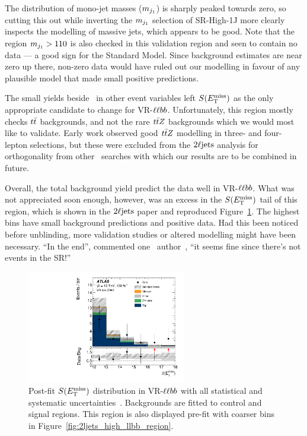 The distribution of mono-jet masses ($m_{j_1}$) is sharply peaked towards zero,
so cutting this out while inverting the $m_{j_1}$ selection of SR-High-1J
more clearly inspects the modelling of massive jets, which appears to be good.
Note that the region $m_{j_1} > 110$ is also checked in this validation region
and seen to contain no data --- a good sign for the Standard Model.
Since background estimates are near zero up there, non-zero data would have
ruled out our modelling in favour of any plausible model that made small
positive predictions.

The small yields beside \srllbb\ in other event variables left $\metsig$ as
the only appropriate candidate to change for VR-$\llbb$.
Unfortunately, this region mostly checks $t\bar t$ backgrounds, and not the
rare $t\bar t Z$ backgrounds which we would most like to validate.
Early work observed good $t\bar t Z$ modelling in three- and four- lepton
selections, but these were excluded from the $2\ell\mathrm{jets}$ analysis for
orthogonality from other \atlas\ searches with which our results are to be
combined in future.

Overall, the total background yield predict the data well in VR-$\llbb$.
What was not appreciated soon enough, however, was an excess in the $\metsig$
tail of this region, which is shown in the $2\ell\mathrm{jets}$ paper and reproduced
Figure~\ref{fig:2ljets_high_metsig_vrllbb_paper}.
The highest bins have small background predictions and positive data.
Had this been noticed before unblinding, more validation studies or altered
modelling might have been necessary.
``In the end'', commented one \atlas\ author~\cite{comment2022vrllbb},
``it seems fine since there's not events in the SR!''

\begin{figure}[tp]
\centering
\includegraphics[width=0.62\textwidth]{figures/2ljets_vr_llbb_met_sig.pdf}
\caption[
Post-fit $\metsig$ distribution in VR-$\llbb$
]{%
Post-fit $\metsig$ distribution in VR-$\llbb$ with all statistical and
systematic uncertainties~\cite{atlas2022searches}.
Backgrounds are fitted to control and signal regions.
This region is also displayed pre-fit with coarser bins in
Figure~\ref{fig:2ljets_high_llbb_region}.
}
\label{fig:2ljets_high_metsig_vrllbb_paper}
\end{figure}


